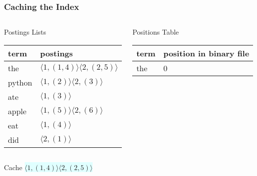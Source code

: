\documentclass{beamer}
\begin{document}
\begin{frame}
  \frametitle{Caching the Index}

  \begin{columns}


    \begin{block}{Postings Lists}
      \begin{tabular}{ l | l }
        term & postings \\ \hline
        \rowcolor{LightCyan}
        the & $ \langle 1,(1,4) \rangle \langle 2,(2,5) \rangle $ \\
        python & $ \langle 1,(2) \rangle \langle 2,(3) \rangle $ \\
        ate & $ \langle 1,(3) \rangle $ \\
        apple & $ \langle 1,(5) \rangle \langle 2,(6) \rangle $ \\
        eat & $ \langle 1,(4) \rangle $ \\
        did & $ \langle 2,(1) \rangle $ \\
      \end{tabular}
    \end{block}


    \begin{block}{Positions Table}
      \begin{tabular}{ l | l }
        term & position in binary file \\ \hline
        \rowcolor{LightCyan}
        the & 0 \\
      \end{tabular}
    \end{block}
    
  \end{columns}

  \begin{block}{Cache}
    \colorbox{LightCyan}{$ \langle 1,(1,4) \rangle \langle 2,(2,5) \rangle $}
  \end{block}
\end{frame}
\end{document}
